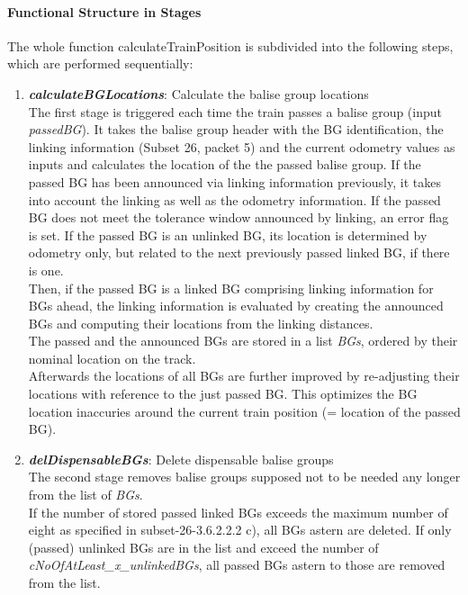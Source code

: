 \begin{itemize}
\paragraph{Functional Structure in Stages}
The whole function calculateTrainPosition is subdivided into the following steps, which are performed sequentially: 
\begin{enumerate}
\item \textbf{\textit{calculateBGLocations}}: Calculate the balise group locations\\
The first stage is triggered each time the train passes a balise group (input \textit{passedBG}). It takes the balise group header with the BG identification, the linking information (Subset 26, packet 5) and the current odometry values as inputs and calculates the location of the the passed balise group. If the passed BG has been announced via linking information previously, it takes into account the linking as well as the odometry information. If the passed BG does not meet the tolerance window announced by linking, an error flag is set. If the passed BG is an unlinked BG, its location is determined by odometry only, but related to the next previously passed linked BG, if there is one.\\
Then, if the passed BG is a linked BG comprising linking information for BGs ahead, the linking information is evaluated by creating the announced BGs and computing their locations from the linking distances.\\
The passed and the announced BGs are stored in a list \textit{BGs}, ordered by their nominal location on the track.\\
Afterwards the locations of all BGs are further improved by re-adjusting their locations with reference to the just passed BG. This optimizes the BG location inaccuries around the current train position (= location of the passed BG). 

\item \textbf{\textit{delDispensableBGs}}: Delete dispensable balise groups\\
The second stage removes balise groups supposed not to be needed any longer from the list of \textit{BGs}.\\
If the number of stored passed linked BGs exceeds the maximum number of eight as specified in subset-26-3.6.2.2.2 c), all BGs astern are deleted.
If only (passed) unlinked BGs are in the list and exceed the number of \textit{cNoOfAtLeast\_x\_unlinkedBGs}, all passed BGs astern to those are removed from the list. 


\end{enumerate}
\end{itemize}
